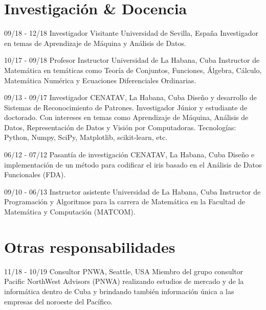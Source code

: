 \documentclass[]{friggeri-cv}
\begin{document}
\section{Investigación \& Docencia}
\begin{entrylist}
  \entry
    {09/18 - 12/18}
    {Investigador Visitante}
    {Universidad de Sevilla, España}
    {Investigador en temas de Aprendizaje de Máquina y Análisis de Datos.\\}
    
  \entry
    {10/17 - 09/18}
    {Profesor Instructor}
    {Universidad de La Habana, Cuba}
    {Instructor de Matemática en temáticas como Teoría de Conjuntos, Funciones, Álgebra, Cálculo, Matemática Numérica y Ecuaciones Diferenciales Ordinarias.\\}
  
  \entry
    {09/13 - 09/17}
    {Investigador}
    {CENATAV, La Habana, Cuba}
    {Diseño y desarrollo de Sistemas de Reconocimiento de Patrones. Investigador Júnior y estudiante de doctorado. Con intereses en temas como Aprendizaje de Máquina, Análisis de Datos, Representación de Datos y Visión por Computadoras. Tecnologías: Python, Numpy, SciPy, Matplotlib, scikit-learn, etc.\\}
\end{entrylist}


\begin{entrylist}
  \entry
    {06/12 - 07/12}
    {Pasantía de investigación}
    {CENATAV, La Habana, Cuba}
    {Diseño e implementación de un método para codificar el iris basado en el Análisis de Datos Funcionales (FDA).\\}

  \entry
    {09/10 - 06/13}
    {Instructor asistente}
    {Universidad de La Habana, Cuba}
    {Instructor  de Programación y Algoritmos para la carrera de Matemática en la Facultad de Matemática y Computación (MATCOM).\\}
\end{entrylist}

\section{Otras responsabilidades}
\begin{entrylist}
  \entry
    {11/18 - 10/19}
    {Consultor}
    {PNWA, Seattle, USA}
    {Miembro del grupo consultor Pacific NorthWest Advisors (PNWA) realizando estudios de mercado y de la informática dentro de Cuba y brindando también información única a las empresas del noroeste del Pacífico.}

\end{entrylist}
\end{document}
